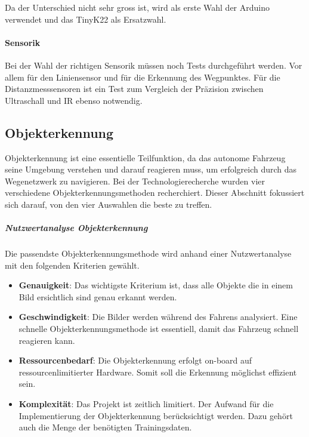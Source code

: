     Da der Unterschied nicht sehr gross ist, wird als erste Wahl der Arduino verwendet und das TinyK22 als Ersatzwahl.

 \paragraph{Sensorik}
 Bei der Wahl der richtigen Sensorik müssen noch Tests durchgeführt werden. Vor allem für den Liniensensor und für die Erkennung des Wegpunktes. Für die Distanzmesssensoren ist ein Test zum Vergleich der Präzision zwischen Ultraschall und IR ebenso notwendig.

\newpage
\subsection{Objekterkennung}

Objekterkennung ist eine essentielle Teilfunktion, da das autonome Fahrzeug seine Umgebung verstehen und darauf reagieren muss, um erfolgreich durch das Wegenetzwerk zu navigieren.
Bei der Technologierecherche wurden vier verschiedene Objekterkennungsmethoden recherchiert.
Dieser Abschnitt fokussiert sich darauf, von den vier Auswahlen die beste zu treffen.

\subparagraph{Nutzwertanalyse Objekterkennung}

Die passendste Objekterkennungsmethode wird anhand einer Nutzwertanalyse mit den folgenden Kriterien gewählt.

\begin{itemize}
\item \textbf{Genauigkeit}: Das wichtigste Kriterium ist, dass alle Objekte die in einem Bild ersichtlich sind genau erkannt werden.
\item \textbf{Geschwindigkeit}: Die Bilder werden während des Fahrens analysiert. Eine schnelle Objekterkennungsmethode ist essentiell, damit das Fahrzeug schnell reagieren kann.
\item \textbf{Ressourcenbedarf}: Die Objekterkennung erfolgt on-board auf ressourcenlimitierter Hardware. Somit soll die Erkennung möglichst effizient sein.
\item \textbf{Komplexität}: Das Projekt ist zeitlich limitiert. Der Aufwand für die Implementierung der Objekterkennung berücksichtigt werden. Dazu gehört auch die Menge der benötigten Trainingsdaten.
\end{itemize}

